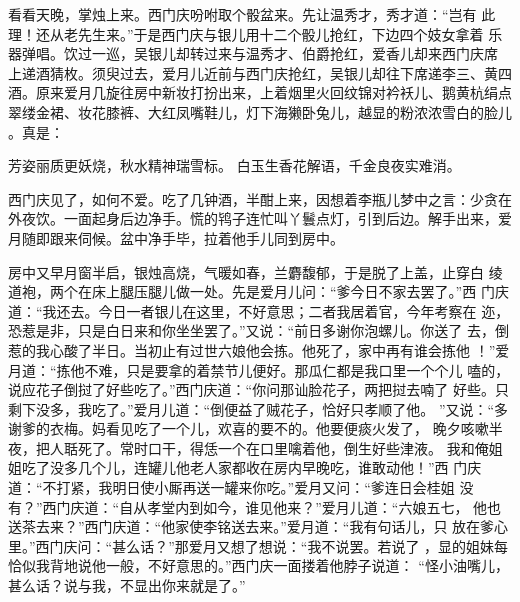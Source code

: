 看看天晚，掌烛上来。西门庆吩咐取个骰盆来。先让温秀才，秀才道：“岂有
此理！还从老先生来。”于是西门庆与银儿用十二个骰儿抢红，下边四个妓女拿着
乐器弹唱。饮过一巡，吴银儿却转过来与温秀才、伯爵抢红，爱香儿却来西门庆席
上递酒猜枚。须臾过去，爱月儿近前与西门庆抢红，吴银儿却往下席递李三、黄四
酒。原来爱月几旋往房中新妆打扮出来，上着烟里火回纹锦对衿袄儿、鹅黄杭绢点
翠缕金裙、妆花膝裤、大红凤嘴鞋儿，灯下海獭卧兔儿，越显的粉浓浓雪白的脸儿
。真是：

芳姿丽质更妖烧，秋水精神瑞雪标。
白玉生香花解语，千金良夜实难消。

西门庆见了，如何不爱。吃了几钟酒，半酣上来，因想着李瓶儿梦中之言：少贪在
外夜饮。一面起身后边净手。慌的鸨子连忙叫丫鬟点灯，引到后边。解手出来，爱
月随即跟来伺候。盆中净手毕，拉着他手儿同到房中。

房中又早月窗半启，银烛高烧，气暖如春，兰麝馥郁，于是脱了上盖，止穿白
绫道袍，两个在床上腿压腿儿做一处。先是爱月儿问：“爹今日不家去罢了。”西
门庆道：“我还去。今日一者银儿在这里，不好意思；二者我居着官，今年考察在
迩，恐惹是非，只是白日来和你坐坐罢了。”又说：“前日多谢你泡螺儿。你送了
去，倒惹的我心酸了半日。当初止有过世六娘他会拣。他死了，家中再有谁会拣他
！”爱月道：“拣他不难，只是要拿的着禁节儿便好。那瓜仁都是我口里一个个儿
嗑的，说应花子倒挝了好些吃了。”西门庆道：“你问那讪脸花子，两把挝去喃了
好些。只剩下没多，我吃了。”爱月儿道：“倒便益了贼花子，恰好只孝顺了他。
”又说：“多谢爹的衣梅。妈看见吃了一个儿，欢喜的要不的。他要便痰火发了，
晚夕咳嗽半夜，把人聒死了。常时口干，得恁一个在口里噙着他，倒生好些津液。
我和俺姐姐吃了没多几个儿，连罐儿他老人家都收在房内早晚吃，谁敢动他！”西
门庆道：“不打紧，我明日使小厮再送一罐来你吃。”爱月又问：“爹连日会桂姐
没有？”西门庆道：“自从孝堂内到如今，谁见他来？”爱月儿道：“六娘五七，
他也送茶去来？”西门庆道：“他家使李铭送去来。”爱月道：“我有句话儿，只
放在爹心里。”西门庆问：“甚么话？”那爱月又想了想说：“我不说罢。若说了
，显的姐妹每恰似我背地说他一般，不好意思的。”西门庆一面搂着他脖子说道：
“怪小油嘴儿，甚么话？说与我，不显出你来就是了。”

